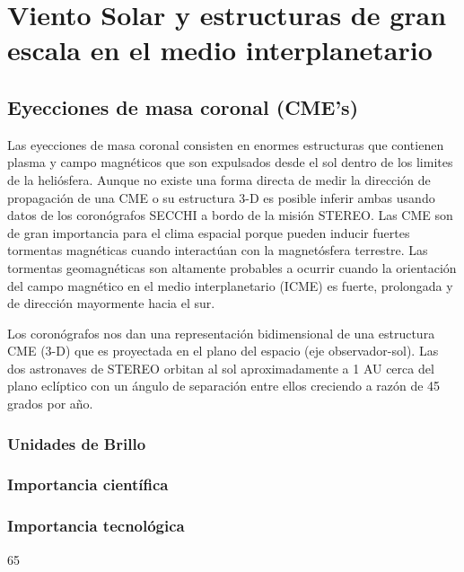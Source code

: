 \chapter{Viento Solar y estructuras de gran escala en el medio interplanetario}

\section*{Eyecciones de masa coronal (CME's)}
Las eyecciones de masa coronal consisten en enormes estructuras que contienen plasma y campo magnéticos que son expulsados desde el sol dentro de los limites de la heliósfera. Aunque no existe una forma directa de medir la dirección de propagación de una CME o su estructura 3-D es posible inferir ambas usando datos de los coronógrafos SECCHI a bordo de la misión STEREO.
Las CME son de gran importancia para el clima espacial porque pueden inducir fuertes tormentas magnéticas cuando interactúan con la magnetósfera terrestre. Las tormentas geomagnéticas son altamente probables a ocurrir cuando la orientación del campo magnético en el medio interplanetario (ICME) es fuerte, prolongada y de dirección mayormente hacia el sur.

Los coronógrafos nos dan una representación bidimensional de una estructura CME (3-D) que es proyectada en el plano del espacio (eje observador-sol). Las dos astronaves de STEREO orbitan al sol aproximadamente a 1 AU cerca del plano eclíptico con un ángulo de separación entre ellos creciendo a razón de 45 grados por año.
\citet{2012LRSP....9....3W}

\subsection*{Unidades de Brillo}
\subsection*{Importancia científica}
\subsection*{Importancia tecnológica}65